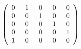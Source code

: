 \documentclass{article}
\begin{document}
\begin{enumerate}[i)]
\begin{minipage}{0.33\linewidth}
\begin{gather*}
\begin{array}{c}
\end{array}\left(
\begin{array}{c@{\hspace{1.5em}}c@{\hspace{1.5em}}c@{\hspace{1.5em}}c@{\hspace{1.5em}}c}
0&1&0&0&0\\
0&0&1&0&0\\
0&0&0&1&0\\
0&0&0&0&1\\
1&0&0&0&0\\
\end{array}\right)
\end{gather*}
\end{minipage}
\hfill
\begin{minipage}{0.15\linewidth}
$$$$
\end{minipage}


\end{enumerate}
\end{document}
